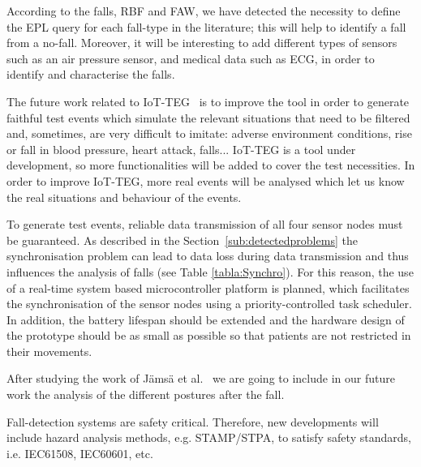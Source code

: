\documentclass[journal]{IEEEtran}
\begin{document}
According to the falls, RBF and FAW, we have detected the necessity to define the
EPL query for each fall-type in the literature; this will
help to identify a fall from a no-fall. Moreover, it will be
interesting to add different types of sensors such as an air 
pressure sensor, and medical data such as ECG, in order to identify and characterise the falls.

The future work related to IoT-TEG~\cite{TesisGutierrez2017,Gutierrez2017} is to improve the tool in order to generate faithful 
test events which simulate the 
relevant situations that need to be filtered and, sometimes, are very difficult to imitate: adverse environment conditions, 
rise or fall in blood pressure, heart attack, falls... IoT-TEG is a
tool under development, so more functionalities will be added
to cover the test necessities. In order to improve IoT-TEG, more real events will be analysed which let us know 
the real situations and behaviour of the events.


To generate test events, reliable data transmission of all four sensor nodes must be guaranteed. As described in 
the Section~\ref{sub:detectedproblems} the synchronisation problem can
lead to data loss during data transmission and  
thus influences the analysis of falls (see Table
\ref{tabla:Synchro}). For this reason, the use of a real-time system  
based microcontroller platform is planned, which facilitates the
synchronisation of the sensor nodes using a  
priority-controlled task scheduler. In addition, the battery lifespan
should be extended and the hardware design of the  
prototype should be as small as possible so that patients are not
restricted in their movements.

After studying the work of J{\"a}ms{\"a} et al.~\cite{jamsa2014fall}
we are going to include in our future work the analysis of 
the different postures after the fall. 

Fall-detection systems are safety critical. Therefore, new developments will include hazard analysis methods, e.g. STAMP/STPA, 
to satisfy safety standards, i.e. IEC61508, IEC60601, etc.
\end{document}
